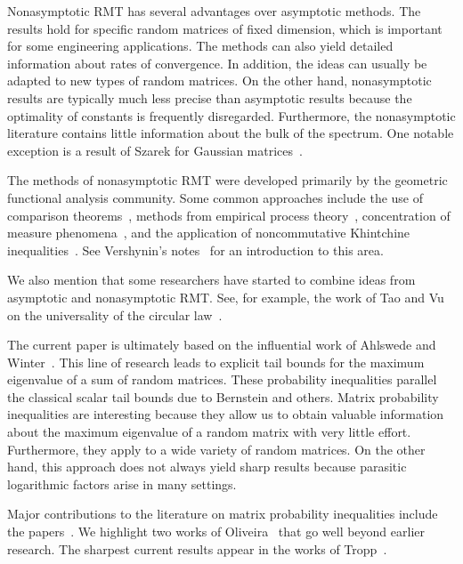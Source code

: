 \documentclass[11pt,letterpaper,twoside,reqno,nosumlimits]{amsart}
\theoremstyle{remark}
\numberwithin{equation}{section}
\numberwithin{thm}{section}
\numberwithin{prop}{section}
\numberwithin{defn}{section}
\numberwithin{remark}{section}
\begin{document}
Nonasymptotic RMT has several advantages over asymptotic methods. The results hold for specific random matrices of fixed dimension, which is important for some engineering applications. The methods can also yield detailed information about rates of convergence. In addition, the ideas can usually be adapted to new types of random matrices. On the other hand, nonasymptotic results are typically much less precise than asymptotic results because the optimality of constants is frequently disregarded. Furthermore, the nonasymptotic literature contains little information about the bulk of the spectrum. One notable exception is a result of Szarek for Gaussian matrices~\cite{Sza90}.

The methods of nonasymptotic RMT were developed primarily by the geometric functional analysis community. Some common approaches include the use of comparison theorems~\cite{DavidsonSzarek01}, methods from empirical process theory~\cite{MP06}, concentration of measure phenomena~\cite{GZ00,AKV02}, and the application of noncommutative Khintchine inequalities~\cite{RU99}. See Vershynin's notes~\cite{Ver10} for an introduction to this area.

We also mention that some researchers have started to combine ideas from asymptotic and nonasymptotic RMT. See, for example, the work of Tao and Vu on the universality of the circular law~\cite{TVK10}.

The current paper is ultimately based on the influential work of Ahlswede and Winter~\cite{AW02}. This line of  research leads to explicit tail bounds for the maximum eigenvalue of a sum of random matrices. These probability inequalities parallel the classical scalar tail bounds due to Bernstein and others. Matrix probability inequalities are interesting because they allow us to obtain valuable information about the maximum eigenvalue of a random matrix with very little effort. Furthermore, they apply to a wide variety of random matrices. On the other hand, this approach does not always yield sharp results because parasitic logarithmic factors arise in many settings.

Major contributions to the literature on matrix probability inequalities include the papers~\cite{CM08, Recht09, Gross11}. We highlight two works of Oliveira~\cite{Oliv09,Oliv10} that go well beyond earlier research. The sharpest current results appear in the works of Tropp~\cite{T10a,Tropp11:Freedman}.

\end{document}

